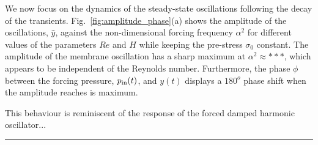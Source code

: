 \documentclass[aps,prl,reprint,superscriptaddress,floatfix]{revtex4-1}
\begin{document}
We now focus on the dynamics of the steady-state oscillations following
the decay of the transients. Fig.~\ref{fig:amplitude_phase}(a) shows the
amplitude of the oscillations, $\widehat{y}$, against the
non-dimensional forcing frequency $\alpha^2$ for different values of the
parameters $Re$ and $H$ while keeping the pre-stress $\sigma_0$ constant.
The amplitude of the membrane oscillation has a sharp maximum at
$\alpha^2 \approx ***$, which appears to be independent of the 
Reynolds number. Furthermore, the phase $\phi$ between the forcing 
pressure, $p_{\rm in}(t)$, and $y(t)$ displays a $180^{o}$ phase shift 
when the amplitude reaches is maximum.

This behaviour is reminiscent of the response of the forced damped
harmonic oscillator...


\hrule


\newpage
\end{document}
